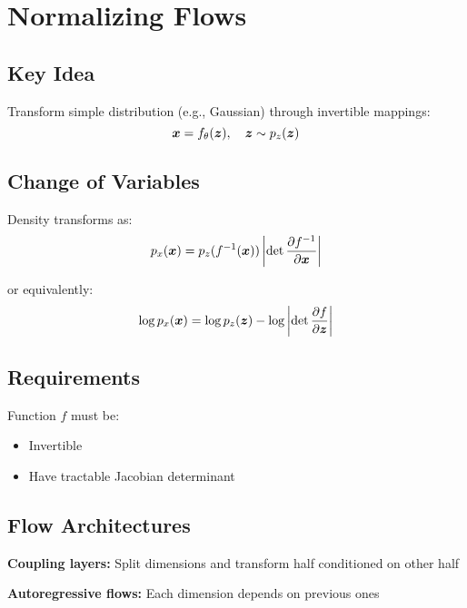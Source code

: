
\section{Normalizing Flows }
\label{sec:normalizing-flows}

\subsection{Key Idea}

Transform simple distribution (e.g., Gaussian) through invertible mappings:
\begin{equation}
\boldsymbol{x} = f_{\theta}(\boldsymbol{z}), \quad \boldsymbol{z} \sim p_z(\boldsymbol{z})
\end{equation}

\subsection{Change of Variables}

Density transforms as:
\begin{equation}
p_x(\boldsymbol{x}) = p_z(f^{-1}(\boldsymbol{x})) \left|\det \frac{\partial f^{-1}}{\partial \boldsymbol{x}}\right|
\end{equation}

or equivalently:
\begin{equation}
\log p_x(\boldsymbol{x}) = \log p_z(\boldsymbol{z}) - \log\left|\det \frac{\partial f}{\partial \boldsymbol{z}}\right|
\end{equation}

\subsection{Requirements}

Function $f$ must be:
\begin{itemize}
    \item Invertible
    \item Have tractable Jacobian determinant
\end{itemize}

\subsection{Flow Architectures}

\textbf{Coupling layers:} Split dimensions and transform half conditioned on other half

\textbf{Autoregressive flows:} Each dimension depends on previous ones

